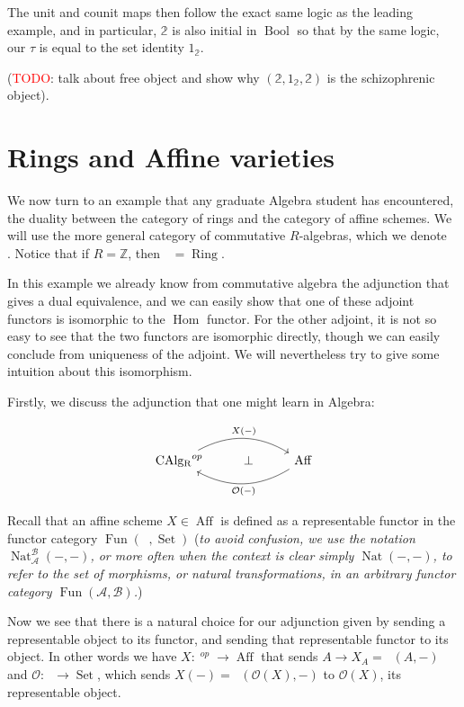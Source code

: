 \documentclass[12pt,a4paper]{article}
\DeclareMathOperator{\Hom}{Hom}
\DeclareMathOperator{\Set}{Set}
\DeclareMathOperator{\Bool}{Bool}
\DeclareMathOperator{\CAlg}{CAlg_R}
\DeclareMathOperator{\CAlgZ}{CAlg_\mathbb{Z}}
\DeclareMathOperator{\Ring}{Ring}
\DeclareMathOperator{\Aff}{Aff}
\DeclareMathOperator{\Fun}{Fun}
\DeclareMathOperator{\Nat}{Nat}
\begin{document}
The unit and counit maps then follow the exact same logic as the leading example, and in particular, $\mathbb{2}$ is also initial in $\Bool$ so that by the same logic, our $\tau$ is equal to the set identity $1_{\mathbb{2}}$. 

(\textcolor{red}{TODO}: talk about free object and show why  $(\mathbb{2}, 1_{\mathbb{2}}, \mathbb{2})$ is the schizophrenic object).

\section{Rings and Affine varieties}

We now turn to an example that any graduate Algebra student has encountered, the duality between the category of rings and the category of affine schemes. We will use the more general category of commutative $R$-algebras, which we denote $\CAlg$. Notice that if $R = \mathbb{Z}$, then $\CAlgZ = \Ring$. 

In this example we already know from commutative algebra the adjunction that gives a dual equivalence, and we can easily show that one of these adjoint functors is isomorphic to the $\Hom$ functor. For the other adjoint, it is not so easy to see that the two functors are isomorphic directly, though we can easily conclude from uniqueness of the adjoint.  We will nevertheless try to give some intuition about this isomorphism.

Firstly, we discuss the adjunction that one might learn in Algebra:

\[\begin{tikzcd}
	{\CAlg^{op}} & \bot & {\Aff}
	\arrow["X(-)" , bend left, from=1-1, to=1-3]
	\arrow["\mathcal{O}(-)", bend left, from=1-3, to=1-1]
\end{tikzcd}\]

Recall that an affine scheme $X \in \Aff$ is defined as a representable functor in the functor category $\Fun(\CAlg, \Set)$ (\emph{to avoid confusion, we use the notation $\Nat_{\mathcal{A}}^{\mathcal{B}}(-,-)$, or more often when the context is clear simply $\Nat(-,-)$, to refer to the set of morphisms, or natural transformations, in an arbitrary functor category $\Fun(\mathcal{A},\mathcal{B})$.})

Now we see that there is a natural choice for our adjunction given by sending a representable object to its functor, and sending that representable functor to its object. In other words we have $X: \CAlg^{op} \to \Aff$ that sends $A \to X_A = \CAlg(A, -)$ and $\mathcal{O}: \CAlg \to \Set$, which sends $X(-) = \CAlg(\mathcal{O}(X), -)$ to $\mathcal{O}(X)$, its representable object.
\end{document}
